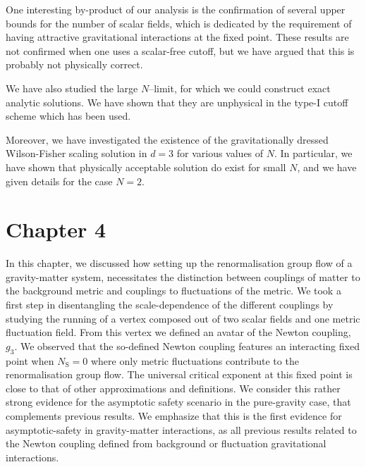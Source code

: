\documentclass[11pt]{book}
\newcommand\NS{ N_{\scriptscriptstyle{\mathrm{S}}} }
\numberwithin{equation}{chapter}
\begin{document}
One interesting by-product of our analysis is the confirmation
of several upper bounds for the number of scalar fields,
which is dedicated by the requirement of having attractive
gravitational interactions at the fixed point.
These results are not confirmed when one uses a scalar-free cutoff,
but we have argued that this is probably not physically correct.

We have also studied the large $N$--limit, for which we could
construct exact analytic solutions.
We have shown that they are unphysical in the type-I cutoff scheme
which has been used.

Moreover, we have investigated the existence of the gravitationally
dressed Wilson-Fisher scaling solution in $d=3$ for various values of $N$.
In particular, we have shown that physically acceptable solution do exist
for small $N$, and we have given details for the case $N=2$.



\section*{Chapter 4}

In this chapter, we discussed how setting up the renormalisation group flow of a gravity-matter system,
necessitates the distinction between couplings of matter to the background metric
and couplings to fluctuations of the metric.
We took a first step in disentangling the scale-dependence of the different couplings by studying
the running of a vertex composed out of two scalar fields and one metric fluctuation field.
From this vertex we defined an avatar of the Newton coupling, $g_3$.
We observed that the so-defined Newton coupling features an interacting fixed point when $\NS=0$
where only metric fluctuations contribute to the renormalisation group flow.
The universal critical exponent at this fixed point is close to that of other approximations and definitions.
We consider this rather strong evidence for the asymptotic safety scenario  in the pure-gravity case,
that complements previous results.
We emphasize that this is the first evidence for asymptotic-safety in gravity-matter interactions,
as all previous results related to the Newton coupling defined from background or fluctuation
gravitational interactions.
\end{document}
